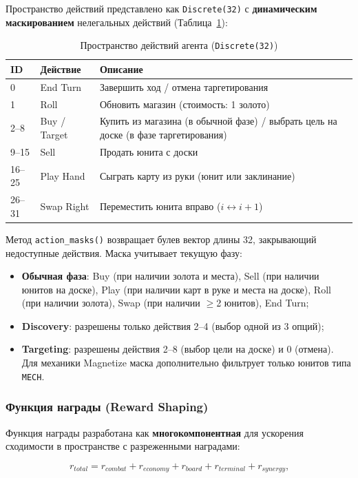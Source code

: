 \documentclass[a4paper,12pt]{extarticle}
\begin{document}
Пространство действий представлено как \texttt{Discrete(32)} с \textbf{динамическим маскированием} нелегальных действий (Таблица~\ref{tab:action_space}):

\begin{longtable}{p{1.5cm}p{3cm}p{9cm}}
\caption{Пространство действий агента (\texttt{Discrete(32)})}\label{tab:action_space}\\
\toprule
\textbf{ID} & \textbf{Действие} & \textbf{Описание} \\
\midrule
0 & End Turn & Завершить ход / отмена таргетирования \\
1 & Roll & Обновить магазин (стоимость: 1 золото) \\
2--8 & Buy / Target & Купить из магазина (в обычной фазе) / выбрать цель на доске (в фазе таргетирования) \\
9--15 & Sell & Продать юнита с доски \\
16--25 & Play Hand & Сыграть карту из руки (юнит или заклинание) \\
26--31 & Swap Right & Переместить юнита вправо ($i \leftrightarrow i{+}1$) \\
\bottomrule
\end{longtable}

Метод \texttt{action\_masks()} возвращает булев вектор длины 32, закрывающий недоступные действия. Маска учитывает текущую фазу:
\begin{itemize}[noitemsep]
  \item \textbf{Обычная фаза}: Buy (при наличии золота и места), Sell (при наличии юнитов на доске), Play (при наличии карт в руке и места на доске), Roll (при наличии золота), Swap (при наличии $\geq$2 юнитов), End Turn;
  \item \textbf{Discovery}: разрешены только действия 2--4 (выбор одной из 3 опций);
  \item \textbf{Targeting}: разрешены действия 2--8 (выбор цели на доске) и 0 (отмена). Для механики Magnetize маска дополнительно фильтрует только юнитов типа \texttt{MECH}.
\end{itemize}

\subsubsection{Функция награды (Reward Shaping)}

Функция награды разработана как \textbf{многокомпонентная} для ускорения сходимости в пространстве с разреженными наградами:

\begin{equation}
r_{total} = r_{combat} + r_{economy} + r_{board} + r_{terminal} + r_{synergy}\text{,}
\end{equation}
\end{document}

